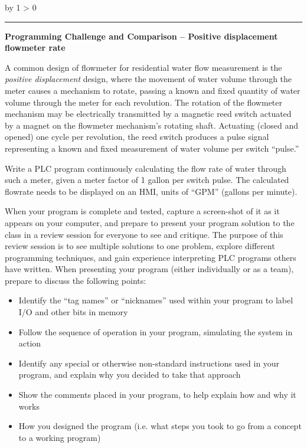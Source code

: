 \documentclass[12pt,a4paper]{article}
\def\oppgave{
            \advance\questnum by 1
            \ifnum \questnum > 0
                 \hrule
                 \vskip 3pt
                 \leftline{Oppgave \the\questnum}
                 \vskip 3pt \fi}
\begin{document}

\vfil \eject 



\oppgave{} 

\noindent
{\bf Programming Challenge and Comparison -- Positive displacement flowmeter rate} 

\vskip 10pt

A common design of flowmeter for residential water flow measurement is the {\it positive displacement} design, where the movement of water volume through the meter causes a mechanism to rotate, passing a known and fixed quantity of water volume through the meter for each revolution.  The rotation of the flowmeter mechanism may be electrically transmitted by a magnetic reed switch actuated by a magnet on the flowmeter mechanism's rotating shaft.  Actuating (closed and opened) one cycle per revolution, the reed switch produces a pulse signal representing a known and fixed measurement of water volume per switch ``pulse.''

\vskip 10pt

Write a PLC program continuously calculating the flow rate of water through such a meter, given a meter factor of 1 gallon per switch pulse.  The calculated flowrate needs to be displayed on an HMI, units of ``GPM'' (gallons per minute). 

\vskip 10pt

When your program is complete and tested, capture a screen-shot of it as it appears on your computer, and prepare to present your program solution to the class in a review session for everyone to see and critique.  The purpose of this review session is to see multiple solutions to one problem, explore different programming techniques, and gain experience interpreting PLC programs others have written.  When presenting your program (either individually or as a team), prepare to discuss the following points:

\begin{itemize}
\item{} Identify the ``tag names'' or ``nicknames'' used within your program to label I/O and other bits in memory
\item{} Follow the sequence of operation in your program, simulating the system in action
\item{} Identify any special or otherwise non-standard instructions used in your program, and explain why you decided to take that approach
\item{} Show the comments placed in your program, to help explain how and why it works
\item{} How you designed the program (i.e. what steps you took to go from a concept to a working program)
\end{itemize}
\end{document}
